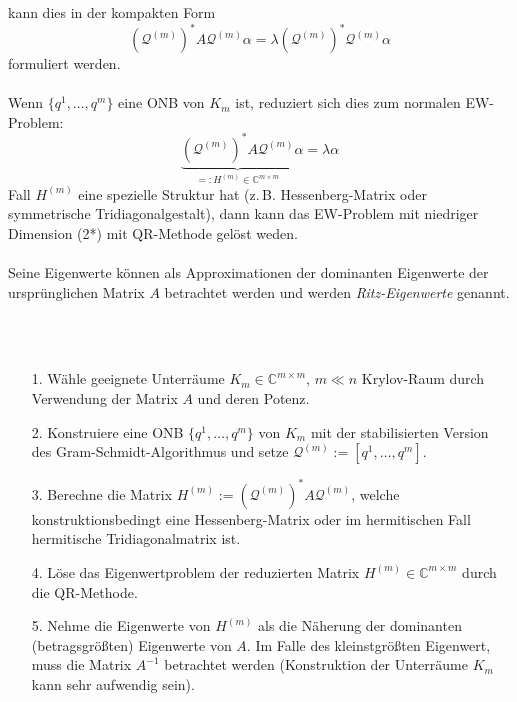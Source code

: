 kann dies in der kompakten Form 
\[(\mathcal{Q}^{(m)})^*A\mathcal{Q}^{(m)}\alpha = \lambda (\mathcal{Q}^{(m)})^*\mathcal{Q}^{(m)}\alpha\]
formuliert werden. \\ \\
Wenn $\{q^1,\dotsc,q^m\}$ eine ONB von $K_m$ ist, reduziert sich dies zum normalen EW-Problem:
\[\underbrace{(\mathcal{Q}^{(m)})^*A\mathcal{Q}^{(m)}}_{=: H^{(m)}\in\mathbb{C}^{m\times m}}\alpha = 
\lambda \alpha \tag{2*}\]
Fall $H^{(m)}$ eine spezielle Struktur hat (z.\,B. Hessenberg-Matrix oder symmetrische Tridiagonalgestalt), dann kann 
das EW-Problem mit niedriger Dimension (2*) mit QR-Methode gelöst weden. \\ \\
Seine Eigenwerte können als Approximationen der dominanten Eigenwerte der ursprünglichen Matrix $A$ betrachtet werden
und werden \textit{Ritz-Eigenwerte} genannt. \\ \\
\begin{sumbox} \ 
    \begin{enumerate}
        \item[1.] Wähle geeignete Unterräume $K_m\in\mathbb{C}^{m\times m}$, $m\ll n$ Krylov-Raum durch Verwendung der 
        Matrix $A$ und deren Potenz.
        \item[2.] Konstruiere eine ONB $\{q^1,\dotsc, q^m\}$ von $K_m$ mit der stabilisierten Version des 
        Gram-Schmidt-Algorithmus und setze $\mathcal{Q}^{(m)}:=[q^1,\dotsc,q^m]$.
        \item[3.] Berechne die Matrix $H^{(m)}:=(\mathcal{Q}^{(m)})^*A\mathcal{Q}^{(m)}$, welche 
        konstruktionsbedingt eine Hessenberg-Matrix oder im hermitischen Fall hermitische Tridiagonalmatrix ist. 
        \item[4.] Löse das Eigenwertproblem der reduzierten Matrix $H^{(m)}\in\mathbb{C}^{m\times m}$ durch die 
        QR-Methode.
        \item[5.] Nehme die Eigenwerte von $H^{(m)}$ als die Näherung der dominanten (betragsgrößten) Eigenwerte 
        von $A$. Im Falle des kleinstgrößten Eigenwert, muss die Matrix $A^{-1}$ betrachtet werden (Konstruktion 
        der Unterräume $K_m$ kann sehr aufwendig sein).
    \end{enumerate}
\end{sumbox}
